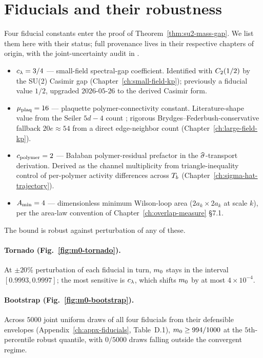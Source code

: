 \section{Fiducials and their robustness}
\label{sec:fiducials-overview}

%
Four fiducial constants enter the proof of
Theorem~\ref{thm:su2-mass-gap}.  We list them here with their
status; full provenance lives in their respective chapters of
origin, with the joint-uncertainty audit in
.

\begin{itemize}
  \item $c_\lambda = 3/4$ — small-field spectral-gap coefficient.
    Identified with $C_2(1/2)$ by the SU(2) Casimir gap
    (Chapter~\ref{ch:small-field-kp}); previously a fiducial value
    $1/2$, upgraded $2026$-$05$-$26$ to the derived Casimir form.
  \item $\mu_{\mathrm{plaq}} = 16$ — plaquette polymer-connectivity constant.
    Literature-shape value from the Seiler $5d - 4$ count
    \cite{Seiler1982}; rigorous Brydges--Federbush-conservative
    fallback $20e \approx 54$ from a direct edge-neighbor count
    (Chapter~\ref{ch:large-field-kp}).
  \item $c_{\mathrm{polymer}} = 2$ — Bałaban polymer-residual prefactor in
    the $\widehat{\sigma}$-transport derivation.  Derived as the channel
    multiplicity from triangle-inequality control of per-polymer
    activity differences across $T_b$
    (Chapter~\ref{ch:sigma-hat-trajectory}).
  \item $A_{\min} = 4$ — dimensionless minimum Wilson-loop area
    ($2 a_k \times 2 a_k$ at scale $k$), per the area-law
    convention of Chapter~\ref{ch:overlap-measure} \S7.1.
\end{itemize}

The bound is robust against perturbation of any of these.

\paragraph*{Tornado (Fig.~\ref{fig:m0-tornado}).}  At $\pm 20\%$
perturbation of each fiducial in turn, $m_0$ stays in the
interval $[0.9993, 0.9997]$; the most sensitive is $c_\lambda$,
which shifts $m_0$ by at most $4 \times 10^{-4}$.

\paragraph*{Bootstrap (Fig.~\ref{fig:m0-bootstrap}).}  Across $5000$
joint uniform draws of all four fiducials from their defensible
envelopes (Appendix~\ref{ch:appx-fiducials}, Table~D.1),
$m_0 \ge 994/1000$ at the $5$th-percentile robust quantile,
with $0/5000$ draws falling outside the convergent regime.

